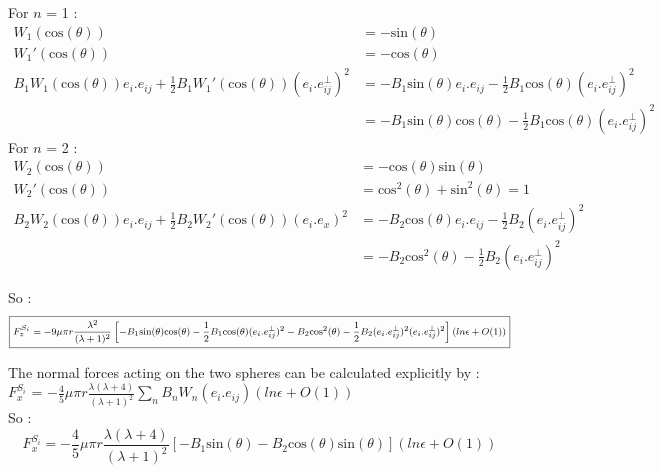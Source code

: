 \documentclass{article}
\begin{document}
For $n$ = 1 : \begin{align*}
    W_1(\mathrm{cos}(\theta)) &= -\mathrm{sin}(\theta) \\
    W_1'(\mathrm{cos}(\theta)) &= -\mathrm{cos}(\theta) \\
    B_1 W_1(\mathrm{cos}(\theta))e_i.e_{ij}+ \frac{1}{2} B_1  W_1'(\mathrm{cos}(\theta)) (e_i.e^{\perp}_{ij})^2  &= -B_1 \mathrm{sin}(\theta)e_i.e_{ij} - \frac{1}{2} B_1  \mathrm{cos}(\theta) (e_i.e^{\perp}_{ij})^2 \\
    &= -B_1 \mathrm{sin}(\theta)\mathrm{cos}(\theta) - \frac{1}{2} B_1  \mathrm{cos}(\theta) (e_i.e^{\perp}_{ij})^2
\end{align*} 
For $n$ = 2 : \begin{align*}
    W_2(\mathrm{cos}(\theta)) &= -\mathrm{cos}(\theta)\mathrm{sin}(\theta) \\
    W_2'(\mathrm{cos}(\theta)) &= \mathrm{cos}^2(\theta)+ \mathrm{sin}^2(\theta) = 1\\
    B_2 W_2(\mathrm{cos}(\theta))e_i.e_{ij}+ \frac{1}{2} B_2  W_2'(\mathrm{cos}(\theta)) (e_i.e_x)^2  &= -B_2 \mathrm{cos}(\theta)e_i.e_{ij} - \frac{1}{2} B_2 (e_i.e^{\perp}_{ij})^2 \\
    &= -B_2 \mathrm{cos}^2(\theta) - \frac{1}{2} B_2 (e_i.e^{\perp}_{ij})^2
\end{align*}  

So :
\begin{equation*}
\footnotesize
\boxed{
    F_z^{S_i} = -9 \mu \pi r \frac{\lambda ^2}{(\lambda +1)^2} \left[ -B_1 \mathrm{sin}(\theta)\mathrm{cos}(\theta) - \frac{1}{2} B_1  \mathrm{cos}(\theta) (e_i.e^{\perp}_{ij})^2 -B_2 \mathrm{cos}^2(\theta) - \frac{1}{2} B_2 (e_i.e^{\perp}_{ij})^2(e_i.e^{\perp}_{ij})^2\right](ln \epsilon + O(1))}
\end{equation*}
\normalsize
\vspace{0.5cm}

The normal forces acting on the two spheres can be calculated explicitly by : \\
 $F_x^{S_i}$ = $-\frac{4}{5} \mu \pi r \frac{\lambda(\lambda +4)}{(\lambda +1)^2} \sum_{n} B_n W_n(e_i.e_{ij}) (ln \epsilon + O(1))$ \cite{Brumley}
\\ So :
\begin{equation*}
    \boxed{F_x^{S_i} = -\frac{4}{5} \mu \pi r \frac{\lambda(\lambda +4)}{(\lambda +1)^2} \left[ -B_1\mathrm{sin}(\theta) -B_2\mathrm{cos}(\theta)\mathrm{sin}(\theta)\right] (ln \epsilon + O(1))}
\end{equation*}
\end{document}

